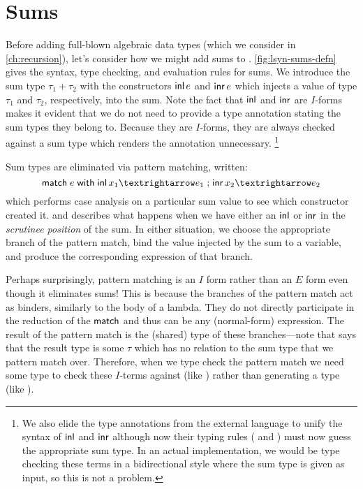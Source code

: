 \section{Sums}



Before adding full-blown algebraic data types (which we consider in \autoref{ch:recursion}), let's consider how we might add sums to \lsyn{}.
\autoref{fig:lsyn-sums-defn} gives the syntax, type checking, and evaluation rules for sums.
We introduce the sum type $τ_1 + τ_2$ with the constructors $\minl{e}$ and $\minr{e}$ which injects a value of type $τ_1$ and $τ_2$, respectively, into the sum.
Note the fact that $\minl{\!}$ and $\minr{\!}$ are $I$-forms makes it evident that we do not need to provide a type annotation stating the sum types they belong to.
Because they are $I$-forms, they are always checked against a sum type which renders the annotation unnecessary.%
\footnote{%
  We also elide the type annotations from the external language to unify the syntax of $\minl{\!}$ and $\minr{\!}$ although now their typing rules ( and ) must now guess the appropriate sum type.
  In an actual implementation, we would be type checking these terms in a bidirectional style where the sum type is given as input, so this is not a problem.
}

Sum types are eliminated via pattern matching, written:
\[
  \mmatch\;e\;\mwith\;\minl{x_1} → e_1 \semisep \minr{x_2} → e_2
\]
which performs case analysis on a particular sum value to see which constructor created it.
 and  describes what happens when we have either an $\minl{\!}$ or $\minr{\!}$ in the \emph{scrutinee position} of the sum.
In either situation, we choose the appropriate branch of the pattern match, bind the value injected by the sum to a variable, and produce the corresponding expression of that branch.

Perhaps surprisingly, pattern matching is an $I$ form rather than an $E$ form even though it eliminates sums!
This is because the branches of the pattern match act as binders, similarly to the body of a lambda.
They do not directly participate in the reduction of the $\mathsf{match}$ and thus can be any (normal-form) expression.
The result of the pattern match is the (shared) type of these branches---note that  says that the result type is some $τ$ which has no relation to the sum type that we pattern match over.
Therefore, when we type check the pattern match we need some type to check these $I$-terms against (like ) rather than generating a type (like ).

